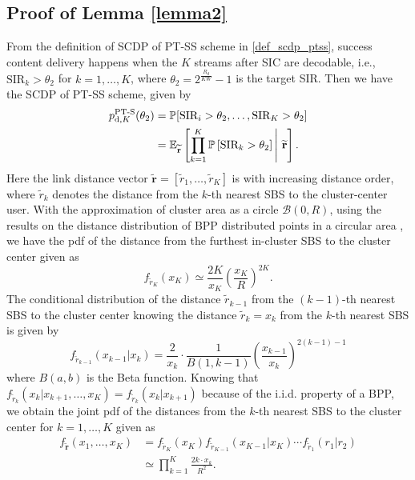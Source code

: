 \documentclass[twocolumns,10pt]{IEEEtran}
\begin{document}
\subsection{Proof of Lemma \ref{lemma2} }
\label{appen2}
From the definition of SCDP of PT-SS scheme in \eqref{def_scdp_ptss}, success content delivery happens when the $K$ streams after SIC are decodable, i.e., $\text{SIR}_k>\theta_2$ for $k=1, \ldots,K$, where $\theta_2=2^{\frac{R_d}{KW}}-1$ is the target SIR. 
Then we have the SCDP of PT-SS scheme, given by
\begin{align}
p_{\textnormal{d},K}^{\text{PT-S}} (\theta_2)
&=\mathbb{P} [\text{SIR}_i>\theta_2, \ldots, \text{SIR}_K>\theta_2]   \nonumber\\
&=\mathbb{E}_{ \widetilde{\mathbf{r}}}\left[\prod\limits_{k=1}^{K} \mathbb{P}\left[\text{SIR}_k>\theta_2 \right]\,\middle|\ \widetilde{\mathbf{r}}\right].
\label{pt_suc}
\end{align}
Here the link distance vector $\widetilde{\mathbf{r}}=[\widetilde{r}_1, \ldots, \widetilde{r}_K]$ is with increasing distance order, where $\widetilde{r}_k$ denotes the distance from the $k$-th nearest SBS to the cluster-center user. With the approximation of cluster area as a circle $\mathcal{B}(0, R)$, using the results on the distance distribution of BPP distributed points in a circular area \cite{distance_finite_network}, we have the pdf of the distance from the furthest in-cluster SBS to the cluster center given as
\begin{equation}
f_{\widetilde{r}_K}(x_K)\simeq \frac{2K}{x_K} \left(\frac{x_K}{R}\right)^{2K}.
\label{pdf_rK}
\end{equation}
The conditional distribution of the distance $\widetilde{r}_{k-1}$ from the $(k-1)$-th nearest SBS to the cluster center knowing the distance $\widetilde{r}_{k}=x_{k}$ from the $k$-th nearest SBS is given by
\begin{equation}
f_{\widetilde{r}_{k-1}}(x_{k-1} | x_{k})=\frac{2}{x_{k}}\cdot\frac{1}{B(1,k-1)}\left(\frac{x_{k-1}}{x_{k}}\right)^{2(k-1)-1}
\end{equation}
where $B(a,b)$ is the Beta function.
Knowing that $f_{\widetilde{r}_{k} }(x_{k}| x_{k+1}, \ldots,x_K)=f_{\widetilde{r}_{k} }(x_{k} | x_{k+1})$ because of the i.i.d. property of a BPP,
we obtain the joint pdf of the distances from the $k$-th nearest SBS to the cluster center for $k=1,\ldots,K$ given as 
\begin{align}
f_{\widetilde{\mathbf{r}}}(x_1, \ldots, x_K)&= f_{\widetilde{r}_{K}}(x_K)f_{\widetilde{r}_{K-1}}(x_{K-1}|x_K)\cdots f_{\widetilde{r}_{1}}(r_1|r_2)\nonumber \\
&\simeq \prod\limits_{k=1}^{K} \frac{2 k\cdot x_k}{R^2} .
\label{pdf_pt}
\end{align} 
\end{document}
